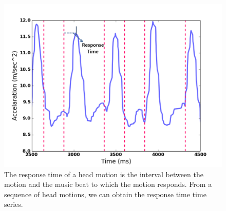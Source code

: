 
\begin{figure}[t]
\includegraphics[width=.75\columnwidth]{figure/waveform_1.png}
\centering
\caption{\label{fig:waveform}The response time of a head motion is the interval between the motion and the music beat to which the motion responds. From a sequence of head motions, we can obtain the response time time series.}
\end{figure}


